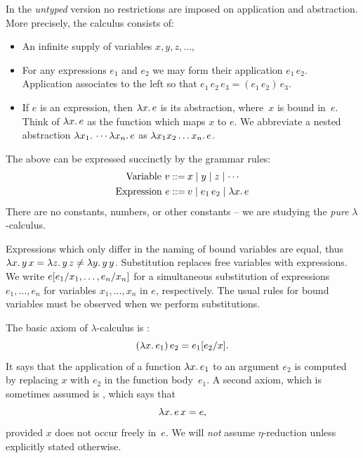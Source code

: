 In the \emph{untyped} version no restrictions are imposed on
application and abstraction. More precisely, the calculus consists of:
%
\begin{itemize}
\item An infinite supply of variables $x, y, z, \ldots$,
\item For any expressions $e_1$ and $e_2$ we may form their
  application $e_1\, e_2$. Application associates to the left so that
  $e_1\, e_2\, e_3 = (e_1\, e_2)\, e_3$.
\item If $e$ is an expression, then $\lambda x .\,e$ is its abstraction,
  where~$x$ is bound in~$e$. Think of $\lambda x .\,e$ as the function
  which maps $x$ to $e$. We abbreviate a nested abstraction
  $\lambda x_1 .\,\cdots \lambda x_n .\,e$ as $\lambda x_1 x_2 \ldots x_n .\,e$.
\end{itemize}
%
The above can be expressed succinctly by the grammar rules:
%
\begin{align*}
  \text{Variable}\ v &\mathbin{{:}{:}{=}} x \mid y \mid z \mid \cdots \\
  \text{Expression}\ e &\mathbin{{:}{:}{=}} v \mid e_1\,e_2 \mid \lambda x .\,e
\end{align*}
%
There are no constants, numbers, or other constants -- we are studying the \emph{pure} $\lambda$-calculus.

Expressions which only differ in the naming of bound variables are
equal, thus $\lambda x .\,y\, x = \lambda z .\,y\, z \neq \lambda y .\,y\,
  y$. Substitution replaces free variables with expressions. We write
$e[e_1/x_1, \ldots, e_n/x_n]$ for a
simultaneous substitution of expressions $e_1, \ldots, e_n$ for
variables $x_1, \ldots, x_n$ in $e$, respectively. The usual rules for
bound variables must be observed when we perform
substitutions.

The basic axiom of $\lambda$-calculus is :
%
\begin{equation*}
  (\lambda x .\,e_1)\, e_2 = e_1[e_2/x].
\end{equation*}
%
It says that the application of a function $\lambda x .\,e_1$ to an
argument $e_2$ is computed by replacing $x$ with $e_2$ in the function
body~$e_1$. A second axiom, which is sometimes assumed is
, which says that
%
\begin{equation*}
  \lambda x .\,e\, x = e,
\end{equation*}
%
provided $x$ does not occur freely in~$e$. We will \emph{not} assume
$\eta$-reduction unless explicitly stated otherwise.


